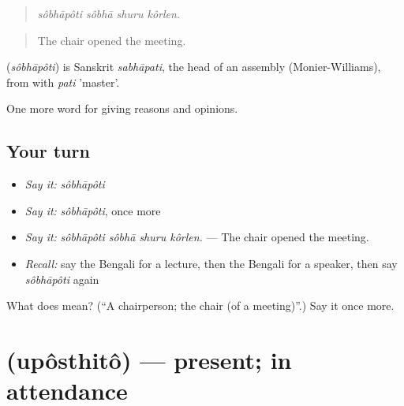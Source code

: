 \begin{quote}
   
\end{quote}

\begin{quote}
\emph{sôbhāpôti sôbhā shuru kôrlen.}
\end{quote}

\begin{quote}
The chair opened the meeting.
\end{quote}

\begin{cousinweb}
\textbf{} (\emph{sôbhāpôti}) is Sanskrit \emph{sabhāpati}, the head of an assembly (Monier-Williams), from  with \emph{pati} 'master'.
\end{cousinweb}

\begin{grammarlens}[title={What you've built}]
One more word for giving reasons and opinions.
\end{grammarlens}

\subsection*{Your turn}
\begin{itemize}
\raggedright
  \item \emph{Say it:} \emph{sôbhāpôti}
  \item \emph{Say it:} \emph{sôbhāpôti}, once more
  \item \emph{Say it:} \emph{sôbhāpôti sôbhā shuru kôrlen.} — The chair opened the meeting.
  \item \emph{Recall:} say the Bengali for a lecture, then the Bengali for a speaker, then say \emph{sôbhāpôti} again
\end{itemize}

\begin{tcolorbox}[breakable,colback=teal!4,colframe=teal!35!black,title={Before you move on}]
What does  mean? (\textquotedblleft{}A chairperson; the chair (of a meeting)\textquotedblright{}.) Say it once more.
\end{tcolorbox}
\section[\texorpdfstring{\bn{উপস্থিত} (upôsthitô)}{উপস্থিত (upôsthitô)}]{ (upôsthitô) — present; in attendance}

\label{lesson:BN-C360-uposthito}



